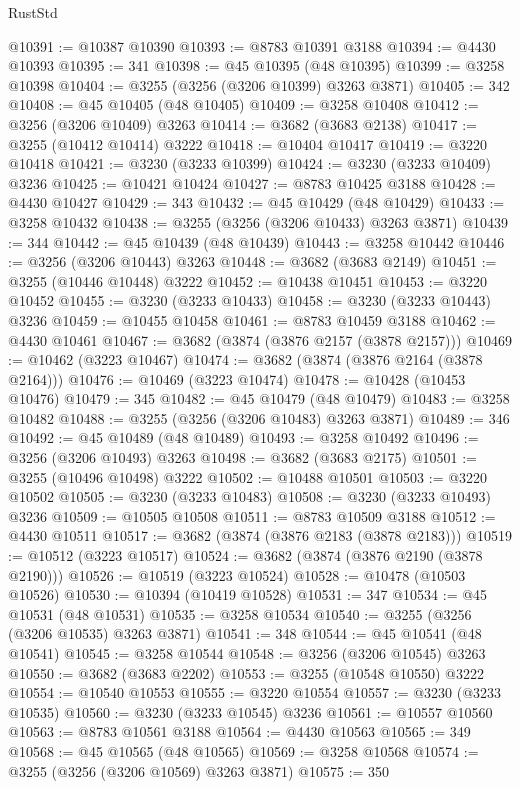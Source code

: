 \begin{lexlean}{RustStd}
\begin{coremodule}
{\begin{coremodule}
{{{{{{{{{{{{{{{{{{{{{{{{{{{{{{{{{{{{{@10391 := @10387 @10390
@10393 := @8783 @10391 @3188
@10394 := @4430 @10393
@10395 := 341
@10398 := @45 @10395 (@48 @10395)
@10399 := @3258 @10398
@10404 := @3255 (@3256 (@3206 @10399) @3263 @3871)
@10405 := 342
@10408 := @45 @10405 (@48 @10405)
@10409 := @3258 @10408
@10412 := @3256 (@3206 @10409) @3263
@10414 := @3682 (@3683 @2138)
@10417 := @3255 (@10412 @10414) @3222
@10418 := @10404 @10417
@10419 := @3220 @10418
@10421 := @3230 (@3233 @10399)
@10424 := @3230 (@3233 @10409) @3236
@10425 := @10421 @10424
@10427 := @8783 @10425 @3188
@10428 := @4430 @10427
@10429 := 343
@10432 := @45 @10429 (@48 @10429)
@10433 := @3258 @10432
@10438 := @3255 (@3256 (@3206 @10433) @3263 @3871)
@10439 := 344
@10442 := @45 @10439 (@48 @10439)
@10443 := @3258 @10442
@10446 := @3256 (@3206 @10443) @3263
@10448 := @3682 (@3683 @2149)
@10451 := @3255 (@10446 @10448) @3222
@10452 := @10438 @10451
@10453 := @3220 @10452
@10455 := @3230 (@3233 @10433)
@10458 := @3230 (@3233 @10443) @3236
@10459 := @10455 @10458
@10461 := @8783 @10459 @3188
@10462 := @4430 @10461
@10467 := @3682 (@3874 (@3876 @2157 (@3878 @2157)))
@10469 := @10462 (@3223 @10467)
@10474 := @3682 (@3874 (@3876 @2164 (@3878 @2164)))
@10476 := @10469 (@3223 @10474)
@10478 := @10428 (@10453 @10476)
@10479 := 345
@10482 := @45 @10479 (@48 @10479)
@10483 := @3258 @10482
@10488 := @3255 (@3256 (@3206 @10483) @3263 @3871)
@10489 := 346
@10492 := @45 @10489 (@48 @10489)
@10493 := @3258 @10492
@10496 := @3256 (@3206 @10493) @3263
@10498 := @3682 (@3683 @2175)
@10501 := @3255 (@10496 @10498) @3222
@10502 := @10488 @10501
@10503 := @3220 @10502
@10505 := @3230 (@3233 @10483)
@10508 := @3230 (@3233 @10493) @3236
@10509 := @10505 @10508
@10511 := @8783 @10509 @3188
@10512 := @4430 @10511
@10517 := @3682 (@3874 (@3876 @2183 (@3878 @2183)))
@10519 := @10512 (@3223 @10517)
@10524 := @3682 (@3874 (@3876 @2190 (@3878 @2190)))
@10526 := @10519 (@3223 @10524)
@10528 := @10478 (@10503 @10526)
@10530 := @10394 (@10419 @10528)
@10531 := 347
@10534 := @45 @10531 (@48 @10531)
@10535 := @3258 @10534
@10540 := @3255 (@3256 (@3206 @10535) @3263 @3871)
@10541 := 348
@10544 := @45 @10541 (@48 @10541)
@10545 := @3258 @10544
@10548 := @3256 (@3206 @10545) @3263
@10550 := @3682 (@3683 @2202)
@10553 := @3255 (@10548 @10550) @3222
@10554 := @10540 @10553
@10555 := @3220 @10554
@10557 := @3230 (@3233 @10535)
@10560 := @3230 (@3233 @10545) @3236
@10561 := @10557 @10560
@10563 := @8783 @10561 @3188
@10564 := @4430 @10563
@10565 := 349
@10568 := @45 @10565 (@48 @10565)
@10569 := @3258 @10568
@10574 := @3255 (@3256 (@3206 @10569) @3263 @3871)
@10575 := 350
}}}}}}}}}}}}}}}}}}}}}}}}}}}}}}}}}}}}}
\end{coremodule}}
\end{coremodule}
\end{lexlean}
